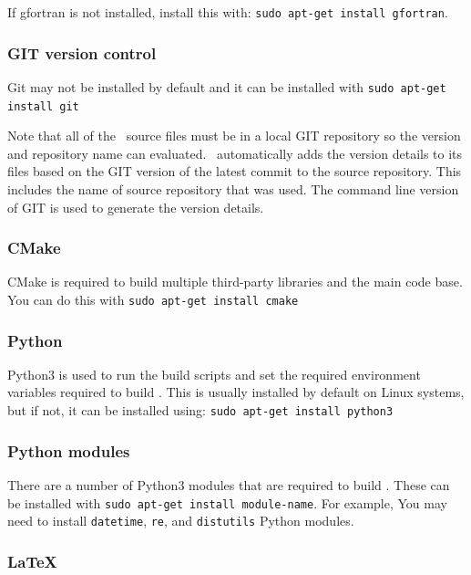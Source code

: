 If gfortran is not installed, install this with: \texttt{sudo apt-get install gfortran}.

\subsubsection*{GIT version control}

Git may not be installed by default and it can be installed with \texttt{sudo apt-get install git}

Note that all of the \CNAME\ source files must be in a local GIT repository so the version and repository name can evaluated. \CNAME\ automatically adds the version details to its files based on the GIT version of the latest commit to the source repository. This includes the name of source repository that was used. The command line version of GIT is used  to generate the version details.

\subsubsection*{CMake}

CMake is required to build multiple third-party libraries and the main code base. You can do this with \texttt{sudo apt-get install cmake}

\subsubsection*{Python}

Python3 is used to run the build scripts and set the required environment variables required to build \CNAME. This is usually installed by default on Linux systems, but if not, it can be installed using: \texttt{sudo apt-get install python3}

\subsubsection*{Python modules}

There are a number of Python3 modules that are required to build \CNAME. These can be installed with \texttt{sudo apt-get install \texttt{module-name}}. For example, You may need to install \texttt{datetime}, \texttt{re}, and \texttt{distutils} Python modules. 

\subsubsection*{\LaTeX}

